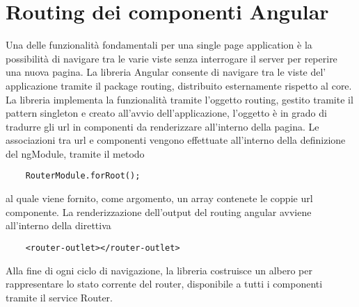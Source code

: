 \section{Routing dei componenti Angular}
Una delle funzionalità fondamentali per una single page application è la possibilità di navigare tra le varie viste senza interrogare il server per reperire una nuova pagina.
La libreria Angular consente di navigare tra le viste del' applicazione tramite il package routing, distribuito esternamente rispetto al core.
\newline
\newline
La libreria implementa la funzionalità tramite l'oggetto routing, gestito tramite il pattern singleton e creato all'avvio dell'applicazione, l'oggetto è in grado di tradurre gli url in componenti da renderizzare all'interno della pagina.
Le associazioni tra url e componenti vengono effettuate all'interno della definizione del ngModule, tramite il metodo 
\begin{verbatim}
    RouterModule.forRoot();
\end{verbatim}
al quale viene fornito, come argomento, un array contenete le coppie url componente.
La renderizzazione dell'output del routing angular avviene all'interno della direttiva
\begin{verbatim}
    <router-outlet></router-outlet>
\end{verbatim}
Alla fine di ogni ciclo di navigazione, la libreria costruisce un albero per rappresentare lo stato corrente del router, disponibile a tutti i componenti tramite il service Router. 
\newpage